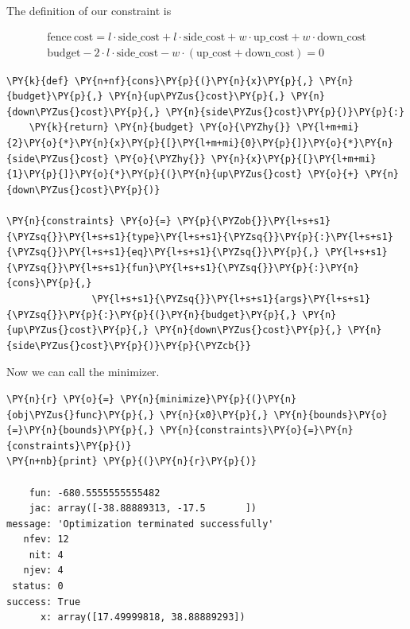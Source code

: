 The definition of our constraint is

\begin{equation*}
\begin{gathered}
\mathrm{fence~cost} = l\cdot\mathrm{side\_cost} + l\cdot\mathrm{side\_cost} + w\cdot\mathrm{up\_cost} + w\cdot\mathrm{down\_cost}\\
\mathrm{budget} - 2\cdot l\cdot\mathrm{side\_cost} - w\cdot(\mathrm{up\_cost} + \mathrm{down\_cost}) = 0
\end{gathered}
\end{equation*}

\begin{codebox}
\begin{Verbatim}[commandchars=\\\{\}]
\PY{k}{def} \PY{n+nf}{cons}\PY{p}{(}\PY{n}{x}\PY{p}{,} \PY{n}{budget}\PY{p}{,} \PY{n}{up\PYZus{}cost}\PY{p}{,} \PY{n}{down\PYZus{}cost}\PY{p}{,} \PY{n}{side\PYZus{}cost}\PY{p}{)}\PY{p}{:}
    \PY{k}{return} \PY{n}{budget} \PY{o}{\PYZhy{}} \PY{l+m+mi}{2}\PY{o}{*}\PY{n}{x}\PY{p}{[}\PY{l+m+mi}{0}\PY{p}{]}\PY{o}{*}\PY{n}{side\PYZus{}cost} \PY{o}{\PYZhy{}} \PY{n}{x}\PY{p}{[}\PY{l+m+mi}{1}\PY{p}{]}\PY{o}{*}\PY{p}{(}\PY{n}{up\PYZus{}cost} \PY{o}{+} \PY{n}{down\PYZus{}cost}\PY{p}{)}

\PY{n}{constraints} \PY{o}{=} \PY{p}{\PYZob{}}\PY{l+s+s1}{\PYZsq{}}\PY{l+s+s1}{type}\PY{l+s+s1}{\PYZsq{}}\PY{p}{:}\PY{l+s+s1}{\PYZsq{}}\PY{l+s+s1}{eq}\PY{l+s+s1}{\PYZsq{}}\PY{p}{,} \PY{l+s+s1}{\PYZsq{}}\PY{l+s+s1}{fun}\PY{l+s+s1}{\PYZsq{}}\PY{p}{:}\PY{n}{cons}\PY{p}{,} 
               \PY{l+s+s1}{\PYZsq{}}\PY{l+s+s1}{args}\PY{l+s+s1}{\PYZsq{}}\PY{p}{:}\PY{p}{(}\PY{n}{budget}\PY{p}{,} \PY{n}{up\PYZus{}cost}\PY{p}{,} \PY{n}{down\PYZus{}cost}\PY{p}{,} \PY{n}{side\PYZus{}cost}\PY{p}{)}\PY{p}{\PYZcb{}}
\end{Verbatim}
\end{codebox}

Now we can call the minimizer.

\begin{codebox}
\begin{Verbatim}[commandchars=\\\{\}]
\PY{n}{r} \PY{o}{=} \PY{n}{minimize}\PY{p}{(}\PY{n}{obj\PYZus{}func}\PY{p}{,} \PY{n}{x0}\PY{p}{,} \PY{n}{bounds}\PY{o}{=}\PY{n}{bounds}\PY{p}{,} \PY{n}{constraints}\PY{o}{=}\PY{n}{constraints}\PY{p}{)}
\PY{n+nb}{print} \PY{p}{(}\PY{n}{r}\PY{p}{)}

    fun: -680.5555555555482
    jac: array([-38.88889313, -17.5       ])
message: 'Optimization terminated successfully'
   nfev: 12
    nit: 4  
   njev: 4
 status: 0
success: True
      x: array([17.49999818, 38.88889293])
\end{Verbatim}
\end{codebox}

